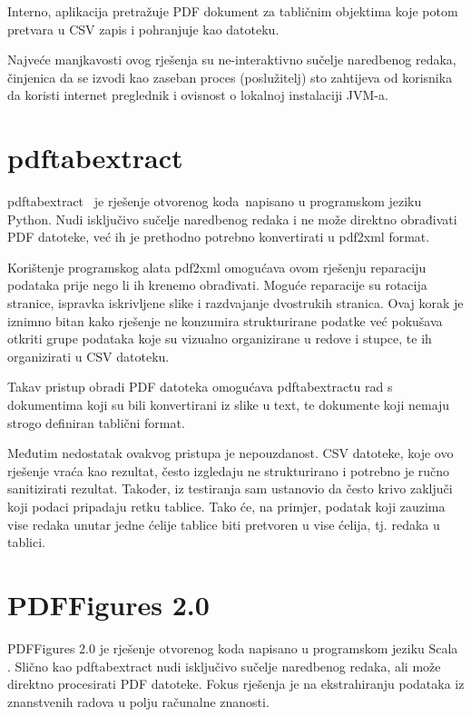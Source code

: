 \documentclass[times, utf8, zavrsni]{fer}
\begin{document}
Interno, aplikacija pretražuje PDF dokument za tabličnim objektima koje potom
pretvara u CSV zapis i pohranjuje kao datoteku.

Najveće manjkavosti ovog rješenja su ne-interaktivno sučelje naredbenog redaka,
činjenica da se izvodi kao zaseban proces (poslužitelj) sto zahtijeva od
korisnika
da koristi internet preglednik i ovisnost o lokalnoj instalaciji JVM-a.

\section{pdftabextract}

pdftabextract \cite{pdftabextract_repository} je rješenje otvorenog koda napisano
u programskom jeziku Python.
Nudi isključivo sučelje naredbenog redaka i ne može direktno obrađivati PDF
datoteke, već ih je prethodno potrebno konvertirati u pdf2xml format.

Korištenje programskog alata pdf2xml omogućava ovom rješenju reparaciju
podataka prije nego li ih krenemo obrađivati. Moguće reparacije su rotacija
stranice, ispravka iskrivljene slike i razdvajanje dvostrukih stranica. Ovaj
korak je iznimno bitan kako rješenje ne konzumira strukturirane podatke već
pokušava otkriti grupe podataka koje su vizualno organizirane u redove i
stupce, te ih organizirati u CSV datoteku.

Takav pristup obradi PDF datoteka omogućava pdftabextractu rad s dokumentima
koji su bili konvertirani iz slike u text, te dokumente koji nemaju strogo
definiran tablični format.

Međutim nedostatak ovakvog pristupa je nepouzdanost.
CSV datoteke, koje ovo rješenje vraća kao rezultat, često izgledaju ne
strukturirano i potrebno je ručno sanitizirati rezultat. Također, iz testiranja
sam ustanovio da često krivo zaključi koji podaci pripadaju retku tablice.
Tako će, na primjer, podatak koji zauzima vise redaka unutar jedne ćelije
tablice biti pretvoren u vise ćelija, tj. redaka u tablici.

\section{PDFFigures 2.0}

PDFFigures 2.0 \cite{pdffigures_2_repository} je rješenje otvorenog koda
napisano u programskom jeziku Scala \cite{scala_documentation}. Slično kao
pdftabextract nudi isključivo
sučelje naredbenog redaka, ali može direktno procesirati PDF datoteke. Fokus
rješenja je na ekstrahiranju podataka iz znanstvenih radova u polju računalne
znanosti.
\end{document}
